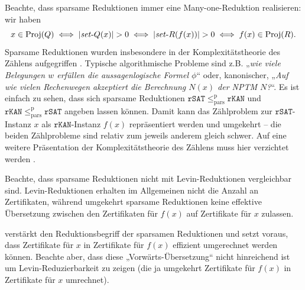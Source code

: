 Beachte, dass sparsame Reduktionen immer eine Many-one-Reduktion realisieren: wir haben 
\[ x\in\Proj(Q) \iff |\fset{}Q(x)|>0 \iff |\fset{}R(f(x))|>0 \iff f(x)\in\Proj(R). \]
Sparsame Reduktionen wurden insbesondere in der Komplexitätstheorie des Zählens aufgegriffen \parencites{simon_central_1975}{valiant_complexity_1979}. Typische algorithmische Probleme sind z.B. „\emph{wie viele Belegungen $w$ erfüllen die aussagenlogische Formel $\phi$}“ oder, kanonischer, „\emph{Auf wie vielen Rechenwegen akzeptiert die Berechnung $N(x)$ der NPTM $N$?}“. Es ist einfach zu sehen, dass sich sparsame Reduktionen $\mathtt{rSAT}\leq_\mathrm{pars}^\mathrm p \mathtt{rKAN}$ und $\mathtt{rKAN}\leq_\mathrm{pars}^\mathrm p \mathtt{rSAT}$ angeben lassen können. Damit kann das Zählproblem zur $\mathtt{rSAT}$-Instanz $x$ als $\mathtt{rKAN}$-Instanz $f(x)$ repräsentiert werden und umgekehrt – die beiden Zählprobleme sind relativ zum jeweils anderem gleich schwer. Auf eine weitere Präsentation der Komplexitätstheorie des Zählens muss hier verzichtet werden \parencites(siehe)()[Kap.~7]{wechsung_vorlesungen_2000}[Chap.~17]{arora_computational_2009}.

Beachte, dass sparsame Reduktionen nicht mit Levin-Reduktionen vergleichbar sind. Levin-Reduktionen erhalten im Allgemeinen nicht die Anzahl an Zertifikaten, während umgekehrt sparsame Reduktionen keine effektive Übersetzung zwischen den Zertifikaten für $f(x)$ auf Zertifikate für $x$ zulassen.
%

\textcite{lynch_structure_1978} verstärkt den Reduktionsbegriff der sparsamen Reduktionen und setzt voraus, dass Zertifikate für $x$ in Zertifikate für $f(x)$ effizient umgerechnet werden können. Beachte aber, dass diese „Vorwärts-Übersetzung“ nicht hinreichend ist um Levin-Reduzierbarkeit zu zeigen (die ja umgekehrt Zertifikate für $f(x)$ in Zertifikate für $x$ umrechnet).

